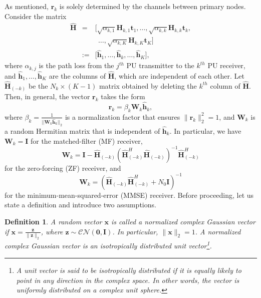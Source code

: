 \documentclass[twocolumn,10pt]{IEEEtran}
\theoremstyle{plain} \newtheorem{theorem}{Theorem}
\theoremstyle{plain} \newtheorem{proposition}{Proposition}
\theoremstyle{plain} \newtheorem{corollary}{Corollary}
\theoremstyle{remark} \newtheorem{remark}{Remark}
\theoremstyle{remark} \newtheorem{lemma}{Lemma}
\theoremstyle{plain} \newtheorem{definition}{Definition}
\theoremstyle{plain} \newtheorem{assumption}{Assumption}
\theoremstyle{plain} \newtheorem{fact}{Fact}
\begin{document}
As mentioned, $\mathbf{r}_k$ is solely determined by the channels between primary nodes. Consider the matrix
\begin{eqnarray*}
\mathbf{\hat{H}}&=&\big[\sqrt{\alpha_{k,1}}\mathbf{H}_{k,1}\mathbf{t}_1, \ldots, \sqrt{\alpha_{k,k}}\mathbf{H}_{k,k}\mathbf{t}_k ,\nonumber\\
&&~~ \ldots, \sqrt{\alpha_{k,K}}\mathbf{H}_{k,K}\mathbf{t}_K\big] \\
&:=&\big[\mathbf{\hat{h}}_1,  \ldots, \mathbf{\hat{h}}_k, \ldots,\mathbf{\hat{h}}_K\big],
\end{eqnarray*}
where $\alpha_{k,j}$ is the path loss from the $j^{th}$ PU transmitter to the $k^{th}$ PU receiver, and $\mathbf{\hat{h}}_1, \ldots,\mathbf{\hat{h}}_K$ are the columns of $\mathbf{\hat{H}}$, which are independent of each other.  Let $\mathbf{\hat{H}}_{(-k)}$ be the $N_k\times(K-1)$ matrix obtained by deleting the $k^{th}$ column of $\mathbf{\hat{H}}$. Then, in general, the vector $\mathbf{r}_k$ takes the form
\begin{equation}\label{eqn:rk}
\mathbf{r}_k=\beta_k \mathbf{W}_k \mathbf{\hat{h}}_k,
\end{equation}
where $\beta_k=\frac{1}{|| \mathbf{W}_k \mathbf{\hat{h}}_k||_2}$ is a normalization factor that ensures $\|\mathbf{r}_k\|_2^2=1$, and $\mathbf{W}_k$ is a random Hermitian matrix that is independent of $\mathbf{\hat{h}}_k$. In particular, we have $\mathbf{W}_k=\mathbf{I}$ for the matched-filter (MF) receiver,
\begin{equation}\label{eqn:ZF}
\mathbf{W}_k=\mathbf{I}-\mathbf{\hat{H}}_{(-k)}(\mathbf{\hat{H}}_{(-k)}^H\mathbf{\hat{H}}_{(-k)})^{-1}\mathbf{\hat{H}}_{(-k)}^H
\end{equation}
for the zero-forcing (ZF) receiver, and
\begin{equation}\label{eqn:MMSE}
\mathbf{W}_k=(\mathbf{\hat{H}}_{(-k)}\mathbf{\hat{H}}_{(-k)}^H+N_0\mathbf{I})^{-1}
\end{equation}
for the minimum-mean-squared-error (MMSE) receiver. Before proceeding, let us state a definition and introduce two assumptions.
\begin{definition}
A random vector $\mathbf{x}$ is called a normalized complex Gaussian vector if $\mathbf{x}=\frac{\mathbf{z}}{\|\mathbf{z}\|_2}$, where $\mathbf{z}\sim \mathcal{CN}(\mathbf{0}, \mathbf{I})$. In particular, $\|\mathbf{x}\|_2=1$. A normalized complex Gaussian vector is an isotropically distributed unit vector\footnote{A unit vector is said to be isotropically distributed if it is equally likely to point in any direction in the complex space. In other words, the vector is uniformly distributed on a complex unit sphere.}.
\end{definition}
\end{document}
